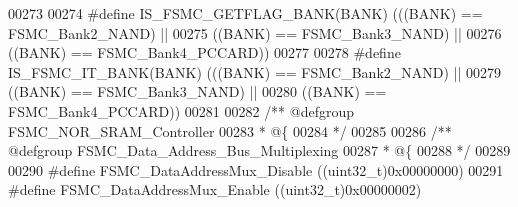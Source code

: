 \begin{DoxyCode}
00273 
00274 \textcolor{preprocessor}{#}\textcolor{preprocessor}{define} \textcolor{preprocessor}{IS\_FSMC\_GETFLAG\_BANK}\textcolor{preprocessor}{(}\textcolor{preprocessor}{BANK}\textcolor{preprocessor}{)} \textcolor{preprocessor}{(}\textcolor{preprocessor}{(}\textcolor{preprocessor}{(}\textcolor{preprocessor}{BANK}\textcolor{preprocessor}{)} \textcolor{preprocessor}{==} FSMC_Bank2_NAND\textcolor{preprocessor}{)} \textcolor{preprocessor}{||}
00275                                     \textcolor{preprocessor}{(}\textcolor{preprocessor}{(}\textcolor{preprocessor}{BANK}\textcolor{preprocessor}{)} \textcolor{preprocessor}{==} FSMC_Bank3_NAND\textcolor{preprocessor}{)} \textcolor{preprocessor}{||}
00276                                     \textcolor{preprocessor}{(}\textcolor{preprocessor}{(}\textcolor{preprocessor}{BANK}\textcolor{preprocessor}{)} \textcolor{preprocessor}{==} FSMC_Bank4_PCCARD\textcolor{preprocessor}{)}\textcolor{preprocessor}{)}
00277 
00278 \textcolor{preprocessor}{#}\textcolor{preprocessor}{define} \textcolor{preprocessor}{IS\_FSMC\_IT\_BANK}\textcolor{preprocessor}{(}\textcolor{preprocessor}{BANK}\textcolor{preprocessor}{)} \textcolor{preprocessor}{(}\textcolor{preprocessor}{(}\textcolor{preprocessor}{(}\textcolor{preprocessor}{BANK}\textcolor{preprocessor}{)} \textcolor{preprocessor}{==} FSMC_Bank2_NAND\textcolor{preprocessor}{)} \textcolor{preprocessor}{||}
00279                                \textcolor{preprocessor}{(}\textcolor{preprocessor}{(}\textcolor{preprocessor}{BANK}\textcolor{preprocessor}{)} \textcolor{preprocessor}{==} FSMC_Bank3_NAND\textcolor{preprocessor}{)} \textcolor{preprocessor}{||}
00280                                \textcolor{preprocessor}{(}\textcolor{preprocessor}{(}\textcolor{preprocessor}{BANK}\textcolor{preprocessor}{)} \textcolor{preprocessor}{==} FSMC_Bank4_PCCARD\textcolor{preprocessor}{)}\textcolor{preprocessor}{)}
00281 
00282 \textcolor{comment}{/** @defgroup FSMC\_NOR\_SRAM\_Controller }
00283 \textcolor{comment}{  * @\{}
00284 \textcolor{comment}{  */}
00285 
00286 \textcolor{comment}{/** @defgroup FSMC\_Data\_Address\_Bus\_Multiplexing }
00287 \textcolor{comment}{  * @\{}
00288 \textcolor{comment}{  */}
00289 
00290 \textcolor{preprocessor}{#}\textcolor{preprocessor}{define} \textcolor{preprocessor}{FSMC\_DataAddressMux\_Disable}                \textcolor{preprocessor}{(}\textcolor{preprocessor}{(}\textcolor{preprocessor}{uint32\_t}\textcolor{preprocessor}{)}0x00000000\textcolor{preprocessor}{)}
00291 \textcolor{preprocessor}{#}\textcolor{preprocessor}{define} \textcolor{preprocessor}{FSMC\_DataAddressMux\_Enable}                 \textcolor{preprocessor}{(}\textcolor{preprocessor}{(}\textcolor{preprocessor}{uint32\_t}\textcolor{preprocessor}{)}0x00000002\textcolor{preprocessor}{)}

\end{DoxyCode}
